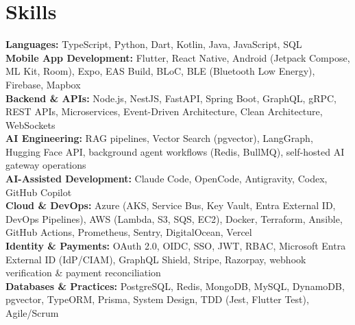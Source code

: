 \documentclass[a4paper,8pt]{article}
\begin{document}
\section{Skills}
\color[HTML]{1C033C}\textbf{Languages:} TypeScript, Python, Dart, Kotlin, Java, JavaScript, SQL\\[3pt]
\color[HTML]{1C033C}\textbf{Mobile App Development:} Flutter, React Native, Android (Jetpack Compose, ML Kit, Room), Expo, EAS Build, BLoC, BLE (Bluetooth Low Energy), Firebase, Mapbox\\[3pt]
\color[HTML]{1C033C}\textbf{Backend \& APIs:} Node.js, NestJS, FastAPI, Spring Boot, GraphQL, gRPC, REST APIs, Microservices, Event-Driven Architecture, Clean Architecture, WebSockets\\[3pt]
\color[HTML]{1C033C}\textbf{AI Engineering:} RAG pipelines, Vector Search (pgvector), LangGraph, Hugging Face API, background agent workflows (Redis, BullMQ), self-hosted AI gateway operations\\[3pt]
\color[HTML]{1C033C}\textbf{AI-Assisted Development:} Claude Code, OpenCode, Antigravity, Codex, GitHub Copilot\\[3pt]
\color[HTML]{1C033C}\textbf{Cloud \& DevOps:} Azure (AKS, Service Bus, Key Vault, Entra External ID, DevOps Pipelines), AWS (Lambda, S3, SQS, EC2), Docker, Terraform, Ansible, GitHub Actions, Prometheus, Sentry, DigitalOcean, Vercel\\[3pt]
\color[HTML]{1C033C}\textbf{Identity \& Payments:} OAuth 2.0, OIDC, SSO, JWT, RBAC, Microsoft Entra External ID (IdP/CIAM), GraphQL Shield, Stripe, Razorpay, webhook verification \& payment reconciliation\\[3pt]
\color[HTML]{1C033C}\textbf{Databases \& Practices:} PostgreSQL, Redis, MongoDB, MySQL, DynamoDB, pgvector, TypeORM, Prisma, System Design, TDD (Jest, Flutter Test), Agile/Scrum\\[3pt]

\end{document}
